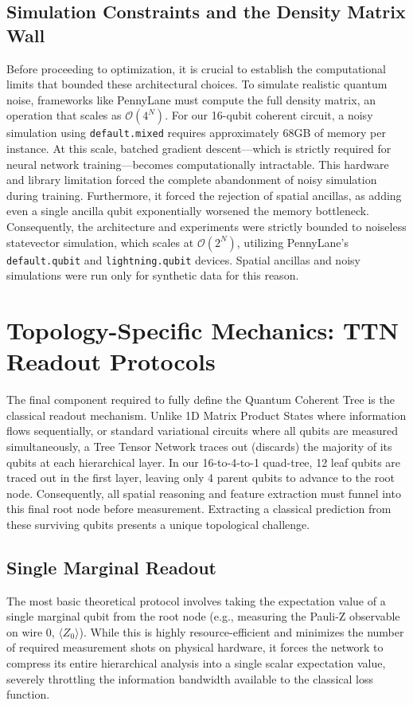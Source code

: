 \documentclass[12pt, a4paper, oneside]{report}
\begin{document}
\subsection{Simulation Constraints and the Density Matrix Wall}
\label{sec:density_wall}
Before proceeding to optimization, it is crucial to establish the computational limits that bounded these architectural choices. To simulate realistic quantum noise, frameworks like PennyLane must compute the full density matrix, an operation that scales as $\mathcal{O}(4^N)$. For our 16-qubit coherent circuit, a noisy simulation using \texttt{default.mixed} requires approximately 68GB of memory per instance. 
At this scale, batched gradient descent—which is strictly required for neural network training—becomes computationally intractable. This hardware and library limitation forced the complete abandonment of noisy simulation during training. Furthermore, it forced the rejection of spatial ancillas, as adding even a single ancilla qubit exponentially worsened the memory bottleneck. Consequently, the architecture and experiments were strictly bounded to noiseless statevector simulation, which scales at $\mathcal{O}(2^N)$, utilizing PennyLane's \texttt{default.qubit} and \texttt{lightning.qubit} devices. Spatial ancillas and noisy simulations were run only for synthetic data for this reason. 

\section{Topology-Specific Mechanics: TTN Readout Protocols}
\label{sec:readout_protocols}
The final component required to fully define the Quantum Coherent Tree is the classical readout mechanism. Unlike 1D Matrix Product States where information flows sequentially, or standard variational circuits where all qubits are measured simultaneously, a Tree Tensor Network traces out (discards) the majority of its qubits at each hierarchical layer. In our 16-to-4-to-1 quad-tree, 12 leaf qubits are traced out in the first layer, leaving only 4 parent qubits to advance to the root node. 
Consequently, all spatial reasoning and feature extraction must funnel into this final root node before measurement. Extracting a classical prediction from these surviving qubits presents a unique topological challenge.

\subsection{Single Marginal Readout}
The most basic theoretical protocol involves taking the expectation value of a single marginal qubit from the root node (e.g., measuring the Pauli-Z observable on wire 0, $\langle Z_0 \rangle$). While this is highly resource-efficient and minimizes the number of required measurement shots on physical hardware, it forces the network to compress its entire hierarchical analysis into a single scalar expectation value, severely throttling the information bandwidth available to the classical loss function.
\end{document}
